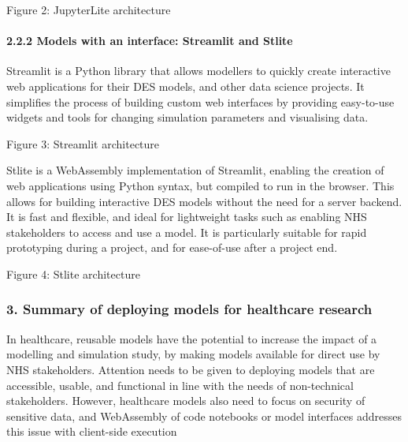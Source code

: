 \documentclass[
  letterpaper,
  DIV=11,
  numbers=noendperiod]{scrreprt}
\begin{document}
Figure 2: JupyterLite architecture

\subsubsection{2.2.2 Models with an interface: Streamlit and
Stlite}\label{models-with-an-interface-streamlit-and-stlite}

Streamlit is a Python library that allows modellers to quickly create
interactive web applications for their DES models, and other data
science projects. It simplifies the process of building custom web
interfaces by providing easy-to-use widgets and tools for changing
simulation parameters and visualising data.

Figure 3: Streamlit architecture

Stlite is a WebAssembly implementation of Streamlit, enabling the
creation of web applications using Python syntax, but compiled to run in
the browser. This allows for building interactive DES models without the
need for a server backend. It is fast and flexible, and ideal for
lightweight tasks such as enabling NHS stakeholders to access and use a
model. It is particularly suitable for rapid prototyping during a
project, and for ease-of-use after a project end.

Figure 4: Stlite architecture

\subsection{\texorpdfstring{\textbf{3. Summary of deploying models for
healthcare
research}}{3. Summary of deploying models for healthcare research}}\label{summary-of-deploying-models-for-healthcare-research}

In healthcare, reusable models have the potential to increase the impact
of a modelling and simulation study, by making models available for
direct use by NHS stakeholders. Attention needs to be given to deploying
models that are accessible, usable, and functional in line with the
needs of non-technical stakeholders. However, healthcare models also
need to focus on security of sensitive data, and WebAssembly of code
notebooks or model interfaces addresses this issue with client-side
execution


\chapter{}\label{section}
\end{document}
